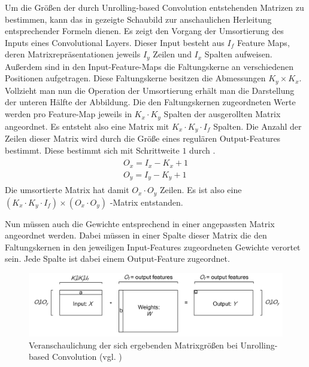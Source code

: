 \documentclass[../main.tex]{subfiles}
\begin{document}
Um die Größen der durch Unrolling-based Convolution entstehenden Matrizen zu bestimmen, kann das in  gezeigte Schaubild zur anschaulichen Herleitung entsprechender Formeln dienen. Es zeigt den Vorgang der Umsortierung des Inputs eines Convolutional Layers. Dieser Input besteht aus $I_f$ Feature Maps, deren Matrixrepräsentationen jeweils $I_y$ Zeilen und $I_x$ Spalten aufweisen. Außerdem sind in den Input-Feature-Maps die Faltungskerne an verschiedenen Positionen aufgetragen. Diese Faltungskerne besitzen die Abmessungen $K_y \times K_x$. Vollzieht man nun die Operation der Umsortierung erhält man die Darstellung der unteren Hälfte der Abbildung. Die den Faltungskernen zugeordneten Werte werden pro Feature-Map jeweils in $K_x \cdot K_y$ Spalten der ausgerollten Matrix angeordnet. Es entsteht also eine Matrix mit $K_x\cdot K_y\cdot I_f$ Spalten. Die Anzahl der Zeilen dieser Matrix wird durch die Größe eines regulären Output-Features bestimmt. Diese bestimmt sich mit Schrittweite $1$ durch .
\begin{align} \label{eq:cuda_output_feature_dim}
\begin{split}
	O_x = I_x -K_x + 1 \\
	O_y = I_y - K_y +1
\end{split}
\end{align}
Die umsortierte Matrix hat damit $O_x\cdot O_y$ Zeilen. Es ist also eine $(K_x\cdot K_y\cdot I_f) \times (O_x\cdot O_y)$ -Matrix entstanden. \par 
Nun müssen auch die Gewichte entsprechend in einer angepassten Matrix angeordnet werden. Dabei müssen in einer Spalte dieser Matrix die den Faltungskernen in den jeweiligen Input-Features zugeordneten Gewichte verortet sein. Jede Spalte ist dabei einem Output-Feature zugeordnet. \par 
\begin{figure}[!htbp]
	\centering
	\includegraphics[width=\linewidth]{../images/Riedle/Unrolling_3.png}
	\caption{Veranschaulichung der sich ergebenden Matrixgrößen bei Unrolling-based Convolution (vgl. \cite{UNROLLING_CONV})} \label{fig:cuda_unrolling_3}
\end{figure}
\end{document}
